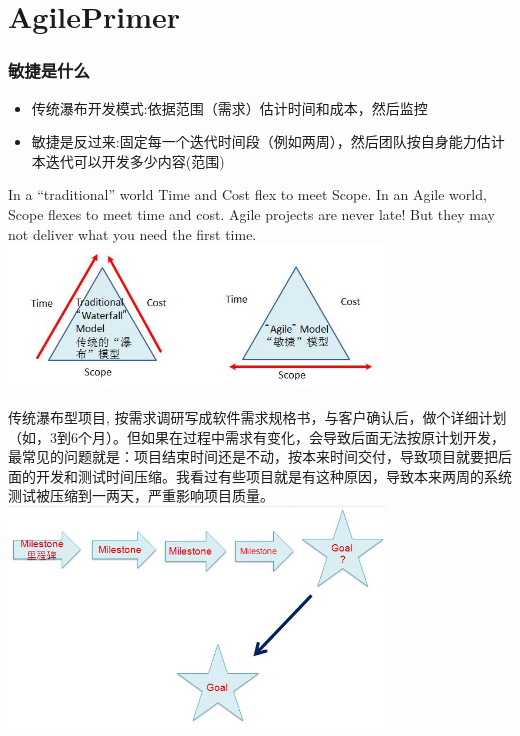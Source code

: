 \chapter{AgilePrimer} %

\hypertarget{ux654fux6377ux662fux4ec0ux4e48}{%
\subsection{敏捷是什么}\label{ux654fux6377ux662fux4ec0ux4e48}}

\begin{itemize}
\tightlist
\item
  传统瀑布开发模式:依据范围（需求）估计时间和成本，然后监控
\item
  敏捷是反过来:固定每一个迭代时间段（例如两周），然后团队按自身能力估计本迭代可以开发多少内容(范围)
\end{itemize}

In a ``traditional'' world Time and Cost flex to meet Scope. In an Agile
world, Scope flexes to meet time and cost. Agile projects are never
late! But they may not deliver what you need the first time.\\

\includegraphics[width=10cm]{P9.jpg}

传统瀑布型项目,
按需求调研写成软件需求规格书，与客户确认后，做个详细计划（如，3到6个月）。但如果在过程中需求有变化，会导致后面无法按原计划开发，最常见的问题就是：项目结束时间还是不动，按本来时间交付，导致项目就要把后面的开发和测试时间压缩。我看过有些项目就是有这种原因，导致本来两周的系统测试被压缩到一两天，严重影响项目质量。\\
\includegraphics[width=10cm]{P10.jpg}

